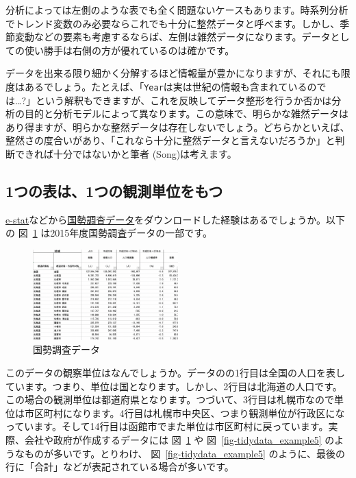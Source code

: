 \documentclass[
  a4paper,
  pandoc,
  ja=standard,
  jafont=haranoaji]{bxjsbook}
\begin{document}
分析によっては左側のような表でも全く問題ないケースもあります。時系列分析でトレンド変数のみ必要ならこれでも十分に整然データと呼べます。しかし、季節変動などの要素も考慮するならば、左側は雑然データになります。データとしての使い勝手は右側の方が優れているのは確かです。

データを出来る限り細かく分解するほど情報量が豊かになりますが、それにも限度はあるでしょう。たとえば、「\texttt{Year}は実は世紀の情報も含まれているのでは\ldots?」という解釈もできますが、これを反映してデータ整形を行うか否かは分析の目的と分析モデルによって異なります。この意味で、明らかな雑然データはあり得ますが、明らかな整然データは存在しないでしょう。どちらかといえば、整然さの度合いがあり、「これなら十分に整然データと言えないだろうか」と判断できれば十分ではないかと筆者
(Song)は考えます。

\hypertarget{ux3064ux306eux8868ux306f1ux3064ux306eux89b3ux6e2cux5358ux4f4dux3092ux3082ux3064}{%
\subsection{1つの表は、1つの観測単位をもつ}\label{ux3064ux306eux8868ux306f1ux3064ux306eux89b3ux6e2cux5358ux4f4dux3092ux3082ux3064}}

\href{https://www.e-stat.go.jp}{e-stat}などから\href{https://www.e-stat.go.jp/stat-search/database?page=1\&toukei=00200521\&tstat=000001080615}{国勢調査データ}をダウンロードした経験はあるでしょうか。以下の
図~\ref{fig-tidydata_example4} は2015年度国勢調査データの一部です。

\begin{figure}

{\centering \includegraphics[width=0.5\textwidth,height=\textheight]{./Figs/Tidydata/MessyData4.png}

}

\caption{\label{fig-tidydata_example4}国勢調査データ}

\end{figure}

このデータの観察単位はなんでしょうか。データのの1行目は全国の人口を表しています。つまり、単位は国となります。しかし、2行目は北海道の人口です。この場合の観測単位は都道府県となります。つづいて、3行目は札幌市なので単位は市区町村になります。4行目は札幌市中央区、つまり観測単位が行政区になっています。そして14行目は函館市でまた単位は市区町村に戻っています。実際、会社や政府が作成するデータには
図~\ref{fig-tidydata_example4} や 図~\ref{fig-tidydata_example5}
のようなものが多いです。とりわけ、 図~\ref{fig-tidydata_example5}
のように、最後の行に「合計」などが表記されている場合が多いです。
\end{document}
